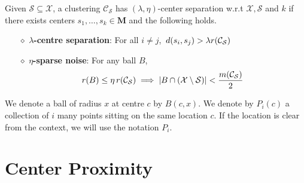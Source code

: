 \documentclass[anon,12pt]{colt2016} %
\newcommand{\mc}{\mathcal}
\newcommand{\mb}{\mathbf}
\begin{document}
\begin{definition}
Given $\mc S \subseteq \mc X$, a clustering $\mc C_{\mc S}$ has $(\lambda, \eta)$-center separation w.r.t $\mc X, \mc S$ and $k$ if there exists centers $s_1, \ldots, s_k \in \mb M$ and the following holds.

\begin{itemize}[nolistsep, noitemsep]
\label{defn:lambdacsnoise}	

\item[$\diamond$] {\bf $\lambda$-centre separation}: For all $i\neq j$, $\thinspace d(s_i, s_j) > \lambda r({\mc C}_{\mc S})$
\item[$\diamond$]{\bf $\eta$-sparse noise}: For any ball $B$, 
\vspace{-0.1in}\begin{align*}
r(B)\leq \eta \thinspace r(\mc{C}_{\mc S}) \implies |B\cap (\mc X\setminus \mc S)| < \frac{m(\mc C_{\mc S})}{2}
\end{align*}
\end{itemize}
\end{definition}

We denote a ball of radius $x$ at centre $c$ by $B(c, x)$. We denote by $P_{i}(c)$ a collection of $i$ many points sitting on the same location $c$. If the location is clear from the context, we will use the notation $P_i$.




\section{Center Proximity}
\label{section:cp}
\end{document}
